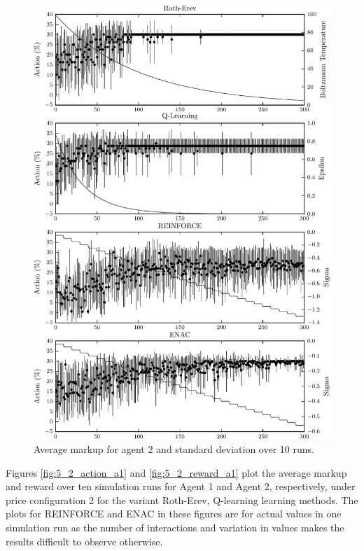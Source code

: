 {	\begin{figure}
	  \centering
	  \includegraphics{figures/fig5_1_action_a2}
	  \caption{Average markup for agent 2 and standard deviation over 10 runs.}
	  \label{fig:5_1_action_a2}
	\end{figure}
}{}

Figures \ref{fig:5_2_action_a1} and \ref{fig:5_2_reward_a1} plot the average
markup and reward over ten simulation runs for Agent 1 and Agent 2,
respectively, under price configuration 2 for the variant Roth-Erev, Q-learning
learning methods.  The plots for REINFORCE and ENAC in these figures are for
actual values in one simulation run as the number of interactions and variation
in values makes the results difficult to observe otherwise.

